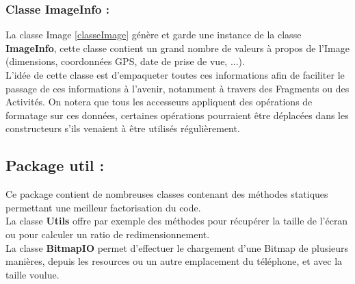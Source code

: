 \subsubsection{Classe \textbf{ImageInfo} :}
La classe Image \ref{classeImage} génère et garde une instance de la classe \textbf{ImageInfo}, cette classe contient un grand nombre de valeurs à propos de l'Image (dimensions, coordonnées GPS, date de prise de vue, ...).
\\
L'idée de cette classe est d'empaqueter toutes ces informations afin de faciliter le passage de ces informations à l'avenir, notamment à travers des Fragments ou des Activités. On notera que tous les accesseurs appliquent des opérations de formatage sur ces données, certaines opérations pourraient être déplacées dans les constructeurs s'ils venaient à être utilisés régulièrement. 

\subsection{Package \textbf{util} :}
Ce package contient de nombreuses classes contenant des méthodes statiques permettant une meilleur factorisation du code.
\\
La classe \textbf{Utils} offre par exemple des méthodes pour récupérer la taille de l'écran ou pour calculer un ratio de redimensionnement.
\\
La classe \textbf{BitmapIO} permet d'effectuer le chargement d'une Bitmap de plusieurs manières, depuis les resources ou un autre emplacement du téléphone, et avec la taille voulue.
